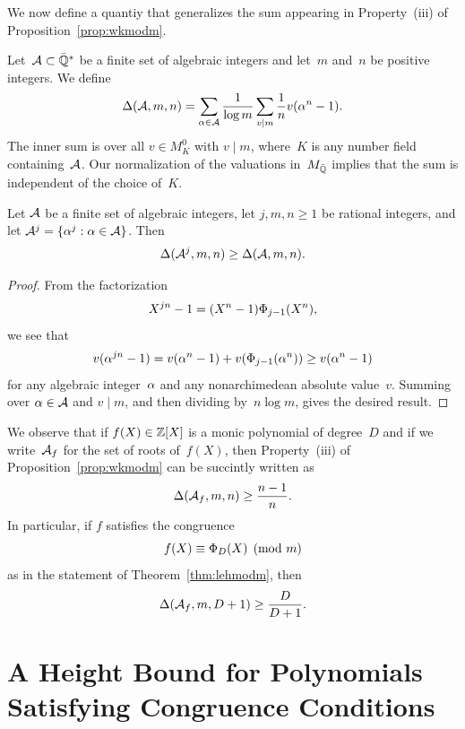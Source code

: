 \documentclass[12pt,reqno]{amsart}
\begin{document}
We now define a quantiy that generalizes the sum appearing in
Property~(iii) of Proposition~\ref{prop:wkmodm}.

\begin{definition}
Let~${\mathcal A}\subset{\bar{\mathbb{Q}}}^*$ be a finite set of algebraic integers and
let~$m$ and~$n$ be positive integers. We define
\[
  \Delta({\mathcal A},m,n) 
  = \sum_{\alpha\in{\mathcal A}}  \frac{1}{\log m} \sum_{v\mid m} \frac{1}{n} v(\alpha^n-1).
\]
The inner sum is over all $v\in M_K^0$ with $v\mid m$, where~$K$ is
any number field containing~${\mathcal A}$. Our normalization of the
valuations in~$M_{\bar{\mathbb{Q}}}$ implies that the sum is independent of the
choice of~$K$.
\end{definition}

\begin{proposition}
\label{prop:DAjmngeDAmn}
Let ${\mathcal A}$ be a finite set of algebraic integers,
let $j,m,n\ge1$ be rational integers, and 
let ${\mathcal A}^j=\{\alpha^j:\alpha\in{\mathcal A}\}$. Then
\[
  \Delta({\mathcal A}^j,m,n) \ge \Delta({\mathcal A},m,n).
\]
\end{proposition}
\begin{proof}
From the factorization
\[
  X^{jn}-1 = (X^n-1)\Phi_{j-1}(X^n),
\]
we see that
\[
  v(\alpha^{jn}-1)=v(\alpha^{n}-1)+v(\Phi_{j-1}(\alpha^n))\ge v(\alpha^{n}-1)
\]
for any algebraic integer~$\alpha$ and any nonarchimedean absolute
value~$v$. Summing over $\alpha\in{\mathcal A}$ and $v\mid m$, and then
dividing by~$n\log m$, gives the desired result.
\end{proof}

\begin{remark}
\label{remark:DAfmD1geDD1}
We observe that if $f(X)\in\mathbb{Z}[X]$ is a monic polynomial of degree~$D$
and if we write~${\mathcal A}_f$ for the set of roots of~$f(X)$, then
Property~(iii) of Proposition~\ref{prop:wkmodm} can be succintly
written as
\begin{equation}
  \label{eqn:DAfmD1geDD1}
  \Delta({\mathcal A}_f,m,n) \ge \frac{n-1}{n}.
\end{equation}
In particular, if $f$ satisfies the congruence
\[
  f(X)  \equiv \Phi_D(X) \pmod{m}
\]
as in the statement of Theorem~\ref{thm:lehmodm}, then
\[
  \Delta({\mathcal A}_f,m,D+1) \ge \frac{D}{D+1}.
\]
\end{remark}


\section{A Height Bound for Polynomials Satisfying Congruence Conditions}
\label{section:htbdforpolys}
\end{document}
